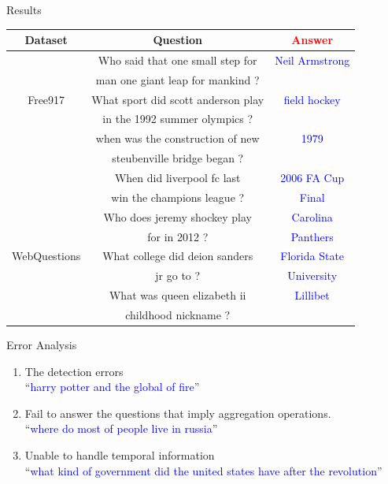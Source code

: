 \documentclass{beamer}
\begin{document}
\begin{frame}{Results}
	\begin{table}[htb!]
	\centering
	\small
	\begin{tabular}{|c|c|c|}
	\hline
	Dataset & Question & \textcolor{red}{Answer}\\
	\hline
 		& Who said that one small step for  & \textcolor{blue}{Neil Armstrong} \\ 
		& man one giant leap for mankind ? & \\ \cline{2-3}
  Free917 & What sport did scott anderson play &  \textcolor{blue}{field hockey} \\ 
		& in the 1992 summer olympics ? & \\ \cline{2-3}
		& when was the construction of new & \textcolor{blue}{1979} \\ 
		& steubenville bridge began ? & \\ \cline{2-3} 
	\hline
 		& When did liverpool fc last & \textcolor{blue}{2006 FA Cup} \\ 
		& win the champions league ? & \textcolor{blue}{Final} \\ \cline{2-3}
 		& Who does jeremy shockey play & \textcolor{blue}{Carolina} \\ 
		&  for in 2012 ? & \textcolor{blue}{Panthers} \\ \cline{2-3}
WebQuestions & What college did deion sanders & \textcolor{blue}{Florida State} \\ 
			&  jr go to ? &  \textcolor{blue}{University} \\ \cline{2-3}
 		& What was queen elizabeth ii & \textcolor{blue}{Lillibet} \\ 
		& childhood nickname ? & \\ \cline{2-3}
	\hline
	\end{tabular}
	\end{table}
\end{frame}

\begin{frame}{Error Analysis}
	\begin{enumerate}
		\item The detection errors \\ ``\textcolor{blue}{harry potter and the global of fire}''
		\item \small Fail to answer the questions that imply aggregation operations. \\
			``\textcolor{blue}{where do most of people live in russia}''
		\item Unable to handle temporal information \\ ``\textcolor{blue}{what kind of government did the united states have after the revolution}''
	\end{enumerate}
\end{frame}
\end{document}
